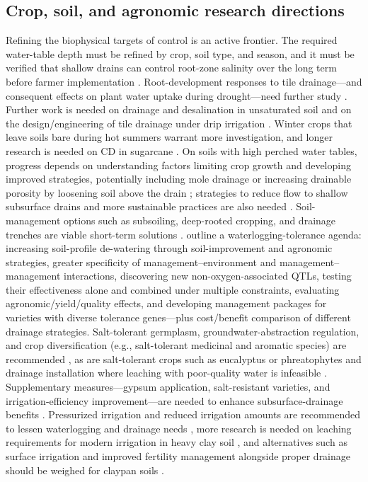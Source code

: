\subsection{Crop, soil, and agronomic research directions}
Refining the biophysical targets of control is an active frontier. The required water-table depth must be refined by crop, soil type, and season, and it must be verified that shallow drains can control root-zone salinity over the long term before farmer implementation \parencite{Christen2001b}. Root-development responses to tile drainage---and consequent effects on plant water uptake during drought---need further study \parencite{Nash2015b}. Further work is needed on drainage and desalination in unsaturated soil and on the design/engineering of tile drainage under drip irrigation \parencite{Chen2021}. Winter crops that leave soils bare during hot summers warrant more investigation, and longer research is needed on CD in sugarcane \parencite{Akram2013}. On soils with high perched water tables, progress depends on understanding factors limiting crop growth and developing improved strategies, potentially including mole drainage or increasing drainable porosity by loosening soil above the drain \parencite{Muirhead1996}; strategies to reduce flow to shallow subsurface drains and more sustainable practices are also needed \parencite{Muirhead1996}. Soil-management options such as subsoiling, deep-rooted cropping, and drainage trenches are viable short-term solutions \parencite{Guedessou2021}. \textcite{Manik2019} outline a waterlogging-tolerance agenda: increasing soil-profile de-watering through soil-improvement and agronomic strategies, greater specificity of management--environment and management--management interactions, discovering new non-oxygen-associated QTLs, testing their effectiveness alone and combined under multiple constraints, evaluating agronomic/yield/quality effects, and developing management packages for varieties with diverse tolerance genes---plus cost/benefit comparison of different drainage strategies. Salt-tolerant germplasm, groundwater-abstraction regulation, and crop diversification (e.g., salt-tolerant medicinal and aromatic species) are recommended \parencite{Qureshi2008}, as are salt-tolerant crops such as eucalyptus or phreatophytes and drainage installation where leaching with poor-quality water is infeasible \parencite{Sarwar2001}. Supplementary measures---gypsum application, salt-resistant varieties, and irrigation-efficiency improvement---are needed to enhance subsurface-drainage benefits \parencite{Ritzema2008b}. Pressurized irrigation and reduced irrigation amounts are recommended to lessen waterlogging and drainage needs \parencite{Khorramian2022}, more research is needed on leaching requirements for modern irrigation in heavy clay soil \parencite{Mahmoud2021}, and alternatives such as surface irrigation and improved fertility management alongside proper drainage should be weighed for claypan soils \parencite{MOSTAGHIMI1989}.

